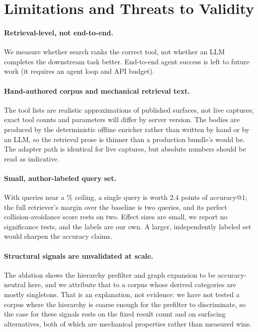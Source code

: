 \documentclass[11pt]{article}
\begin{document}
\section{Limitations and Threats to Validity}
\label{sec:limits}

\paragraph{Retrieval-level, not end-to-end.} We measure whether search ranks the
correct tool, not whether an LLM completes the downstream task better. End-to-end
agent success is left to future work (it requires an agent loop and API budget).

\paragraph{Hand-authored corpus and mechanical retrieval text.} The
\numServers{} tool lists are realistic approximations of published surfaces, not
live captures; exact tool counts and parameters will differ by server version.
The bodies are produced by the deterministic offline enricher rather than written
by hand or by an LLM, so the retrieval prose is thinner than a production bundle's
would be. The adapter path is identical for live captures, but absolute numbers
should be read as indicative.

\paragraph{Small, author-labeled query set.} With \numQueries{} queries near a
\graphAccOne\% ceiling, a single query is worth $2.4$ points of accuracy@1;
the full retriever's margin over the baseline is two queries, and its perfect
collision-avoidance score rests on two. Effect sizes are small, we report no
significance tests, and the labels are our own. A larger, independently labeled
set would sharpen the accuracy claims.

\paragraph{Structural signals are unvalidated at scale.} The ablation shows the
hierarchy prefilter and graph expansion to be accuracy-neutral here, and we
attribute that to a corpus whose derived categories are mostly singletons. That
is an explanation, not evidence: we have not tested a corpus where the hierarchy
is coarse enough for the prefilter to discriminate, so the case for these signals
rests on the fixed result count and on surfacing alternatives, both of which are
mechanical properties rather than measured wins.
\end{document}

